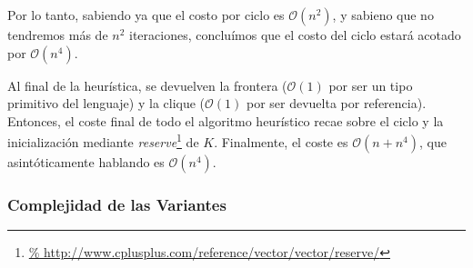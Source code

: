 \par Por lo tanto, sabiendo ya que el costo por ciclo es
    $\mathcal O(n^2)$, y sabieno que no tendremos m\'as
    de $n^2$ iteraciones, conclu\'imos que el costo del
    ciclo estar\'a acotado por $\mathcal O(n^4)$.

\par Al final de la heur\'istica, se devuelven la frontera
    ($\mathcal O(1)$ por ser un tipo primitivo del lenguaje)
    y la clique ($\mathcal O(1)$ por ser devuelta por
    referencia). Entonces, el coste final de todo el algoritmo
    heur\'istico recae sobre el ciclo y la inicializaci\'on
    mediante \emph{reserve}\footnote{\url{%
    http://www.cplusplus.com/reference/vector/vector/reserve/}} de
    $K$. Finalmente, el coste es $\mathcal O(n + n^4)$, que
    asint\'oticamente hablando es $\mathcal O(n^4)$.

\subsubsection{Complejidad de las Variantes\label{bl:compl:variantes}}
\par 

\bigskip

